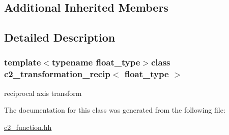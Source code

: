 \subsection*{Additional Inherited Members}


\subsection{Detailed Description}
\subsubsection*{template$<$typename float\-\_\-type$>$class c2\-\_\-transformation\-\_\-recip$<$ float\-\_\-type $>$}

reciprocal axis transform 

The documentation for this class was generated from the following file\-:\begin{DoxyCompactItemize}
\item 
\hyperlink{c2__function_8hh}{c2\-\_\-function.\-hh}\end{DoxyCompactItemize}
